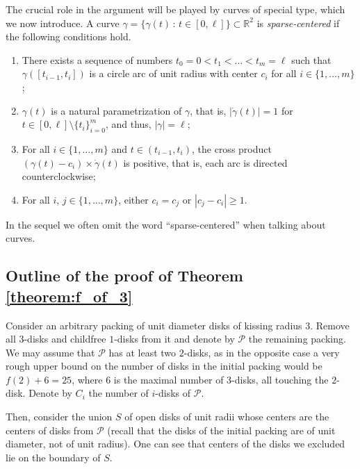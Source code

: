 The crucial role in the argument will be played by curves of special type, which we now introduce. A curve $\gamma = \{\gamma(t)\,\colon\,t\in[0, \ell]\} \subset \mathbb{R}^2$ is \textit{sparse-centered} if the following conditions hold.

\begin{enumerate}[label=(\alph*)]
  \item There exists a sequence of numbers $t_0 = 0 < t_1 < \ldots < t_m=\ell$ such that $\gamma([t_{i-1}, t_i])$ is a circle arc of unit radius with center $c_i$ for all $i\in\{1, \ldots, m\}$;
  \item $\gamma(t)$ is a natural parametrization of $\gamma$, that is, $|\dot{\gamma}(t)| = 1$ for $t\in[0, \ell]\setminus\{t_i\}_{i=0}^m$, and thus, $|\gamma| = \ell$;
  \item For all $i\in\{1, \ldots, m\}$ and $t\in(t_{i-1}, t_i)$, the cross product $(\gamma(t) - c_i)\times \dot{\gamma}(t)$ is positive, that is, each arc is directed counterclockwise;
  \item For all $i$, $j\in\{1, \ldots, m\}$, either $c_i = c_j$ or $|c_j - c_i|\geq 1$.
\end{enumerate}

In the sequel we often omit the word ``sparse-centered'' when talking about curves.

\subsection{Outline of the proof of Theorem \ref{theorem:f_of_3}}

Consider an arbitrary packing of unit diameter disks of kissing radius $3$. Remove all $3$-disks and childfree $1$-disks from it and denote by $\mathcal{P}$ the remaining packing. We may assume that $\mathcal{P}$ has at least two $2$-disks, as in the opposite case a very rough upper bound on the number of disks in the initial packing would be $f(2) + 6 = 25$, where $6$ is the maximal number of $3$-disks, all touching the $2$-disk. Denote by $C_i$ the number of $i$-disks of $\mathcal{P}$.

Then, consider the union $S$ of open disks of unit radii whose centers are the centers of disks from $\mathcal{P}$ (recall that the disks of the initial packing are of unit diameter, not of unit radius). One can see that centers of the disks we excluded lie on the boundary of $S$.


